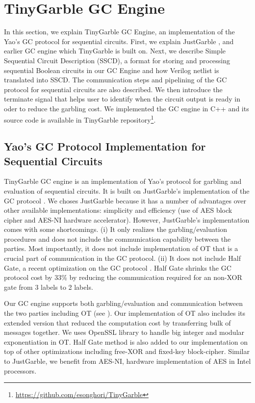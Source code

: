 \chapter{TinyGarble GC Engine}\label{chap:engine}
In this section, we explain TinyGarble GC Engine, an implementation of the Yao's GC protocol for sequential circuits.
First, we explain JustGarble \cite{bellare2013efficient}, and earlier GC engine which TinyGarble is built on. 
Next, we describe Simple Sequential Circuit Description (SSCD), a format for storing and processing sequential Boolean circuits in our GC Engine and how Verilog netlist is translated into SSCD.
The communication steps and pipelining of the GC protocol for sequential circuits are also described.
We then introduce the terminate signal that helps user to identify when the circuit output is ready in oder to reduce the garbling cost.
We implemented the GC engine in C++ and its source code is available in TinyGarble repository\footnote{\url{https://github.com/esonghori/TinyGarble}}.

\section{Yao's GC Protocol Implementation for Sequential Circuits} \label{sec:engine-gc}
TinyGarble GC engine is an implementation of Yao's protocol for garbling and evaluation of sequential circuits.
It is built on JustGarble's implementation of the GC protocol \cite{bellare2013efficient}.
We choses JustGarble because it has a number of advantages over other available implementations: simplicity and efficiency (use of AES block cipher and AES-NI hardware accelerator).
However, JustGarble's implementation comes with some shortcomings.
(i) It only realizes the garbling/evaluation procedures and does not include the communication capability between the parties.
Most importantly, it does not include implementation of OT that is a crucial part of communication in the GC protocol.
(ii) It does not include Half Gate, a recent optimization on the GC protocol \cite{zahur2015two}.
Half Gate shrinks the GC protocol cost by 33\% by reducing the communication required for an non-XOR gate from 3 labels to 2 labels.

Our GC engine supports both garbling/evaluation and communication between the two parties including OT (see ).
Our implementation of OT also includes its extended version \cite{husted2013gpu} that reduced the computation cost by transferring bulk of messages together.
We uses OpenSSL library to handle big integer and modular exponentiation in OT.
Half Gate method is also added to our implementation on top of other optimizations including free-XOR and fixed-key block-cipher.
Similar to JustGarble, we benefit from AES-NI, hardware implementation of AES in Intel processors.

